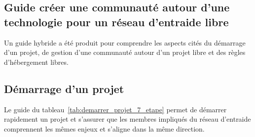 \subsection{Guide créer une communauté autour d’une technologie pour un réseau d’entraide libre}

Un guide hybride a été produit pour comprendre les aspects cités du démarrage d’un projet, de gestion d’une communauté autour d’un projet libre et des règles d'hébergement libres.

\subsection{Démarrage d’un projet}

Le guide du tableau~\ref{tab:demarrer_projet_7_etape} permet de démarrer rapidement un projet et s'assurer que les membres impliqués du réseau d'entraide comprennent les mêmes enjeux et s'aligne dans la même direction.


